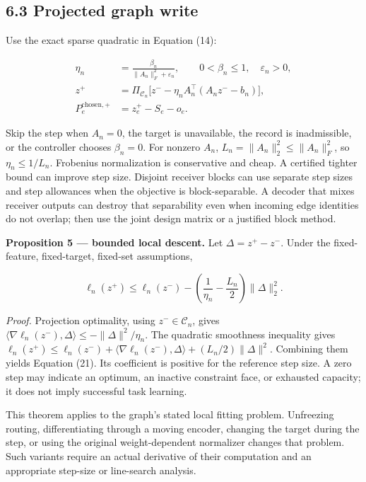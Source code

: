 \documentclass[
  11pt,
  a4paper,
]{article}
\begin{document}
\subsection{6.3 Projected graph write}\label{projected-graph-write}

Use the exact sparse quadratic in Equation (14):

\[
\begin{aligned}
\eta_n&=\frac{\beta_n}{\|A_n\|_F^2+\varepsilon_n},
\qquad 0<\beta_n\le1,\quad\varepsilon_n>0,\\
z^+&=\Pi_{\mathcal C_n}
\big[z^- -\eta_n A_n^\top(A_nz^- -b_n)\big],\\
P_e^{\mathrm{chosen},+}&=z_e^+-S_e-o_e.
\end{aligned}
\tag{20}
\]

Skip the step when \(A_n=0\), the target is unavailable, the record is
inadmissible, or the controller chooses \(\beta_n=0\). For nonzero
\(A_n\), \(L_n=\|A_n\|_2^2\le\|A_n\|_F^2\), so \(\eta_n\le1/L_n\).
Frobenius normalization is conservative and cheap. A certified tighter
bound can improve step size. Disjoint receiver blocks can use separate
step sizes and step allowances when the objective is block-separable. A
decoder that mixes receiver outputs can destroy that separability even
when incoming edge identities do not overlap; then use the joint design
matrix or a justified block method.

\textbf{Proposition 5 --- bounded local descent.} Let
\(\Delta=z^+-z^-\). Under the fixed-feature, fixed-target, fixed-set
assumptions,

\[
\ell_n(z^+)\le\ell_n(z^-)
-\left(\frac1{\eta_n}-\frac{L_n}{2}\right)\|\Delta\|_2^2.
\tag{21}
\]

\emph{Proof.} Projection optimality, using \(z^-\in\mathcal C_n\), gives
\(\langle\nabla\ell_n(z^-),\Delta\rangle\le-\|\Delta\|^2/\eta_n\). The
quadratic smoothness inequality gives
\(\ell_n(z^+)\le\ell_n(z^-)+\langle\nabla\ell_n(z^-),\Delta\rangle+(L_n/2)\|\Delta\|^2\).
Combining them yields Equation (21). Its coefficient is positive for the
reference step size. A zero step may indicate an optimum, an inactive
constraint face, or exhausted capacity; it does not imply successful
task learning.

This theorem applies to the graph's stated local fitting problem.
Unfreezing routing, differentiating through a moving encoder, changing
the target during the step, or using the original weight-dependent
normalizer changes that problem. Such variants require an actual
derivative of their computation and an appropriate step-size or
line-search analysis.
\end{document}
